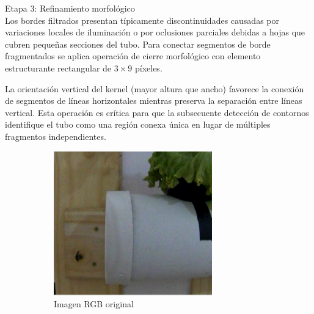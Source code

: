 Etapa 3: Refinamiento morfológico\\
\noindent
Los bordes filtrados presentan típicamente discontinuidades causadas por variaciones locales de iluminación o por oclusiones parciales debidas a hojas que cubren pequeñas secciones del tubo. Para conectar segmentos de borde fragmentados se aplica operación de cierre morfológico con elemento estructurante rectangular de $3 \times 9$ píxeles.

La orientación vertical del kernel (mayor altura que ancho) favorece la conexión de segmentos de líneas horizontales mientras preserva la separación entre líneas vertical. Esta operación es crítica para que la subsecuente detección de contornos identifique el tubo como una región conexa única en lugar de múltiples fragmentos independientes.

\begin{figure}[H]
\centering
\begin{subfigure}[b]{0.48\textwidth}
    \centering
    \includegraphics[width=\textwidth]{imagenes/detector_tubos_1_original.png}
    \caption{Imagen RGB original}
\end{subfigure}
\hfill
\begin{subfigure}[b]{0.48\textwidth}
    \centering

\end{subfigure}
\end{figure}
